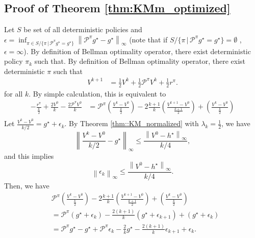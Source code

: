 \documentclass{article} %
\newcommand{\cP}{\mathcal{P}}
\newcommand*{\para}[1]{\left({#1}\right)}
\newcommand*{\infn}[1]{\left\|{#1}\right\|_{\infty}}
\begin{document}
\subsection{Proof of Theorem \ref{thm:KMm_optimized} }

 Let $S$ be set of all deterministic policies and $\epsilon=\inf_{\pi \in S/\{\pi \,|\, \cP^{\pi}g^{\star} =  g^{\star}\}} \infn{\cP^{\pi}g^{\star}-g^{\star}}$ (note that if $S/\{\pi \,|\, \cP^{\pi}g^{\star} =  g^{\star}\} = \emptyset $ , $\epsilon =\infty$). By definition of Bellman optimality operator, there exist deterministic policy $\pi_k$ such that. 
 By definition of Bellman optimality operator, there exist deterministic $\pi$ such that 
  \begin{align*}
        V^{k+1} &= \frac{1}{2}V^{k}+\frac{1}{2}\cP^{\pi}V^{k} + \frac{1}{2}r^{\pi}.
    \end{align*}
    for all $k$. By simple calculation, this is equivalent to
           \begin{align*}
        -\frac{r^{\pi}}{{\frac{k}{2}}}+\frac{2V^0}{k}-\frac{2\cP^{\pi}V^0}{k} &= \cP^{\pi}\para{\frac{V^{k}-V^0}{\frac{k}{2}} }-2\frac{k+1}{k}\para{\frac{V^{k+1}-V^0}{\frac{k+1}{2}}}+\para{\frac{V^{k}-V^0}{\frac{k}{2}}}\\
        \end{align*}
        Let $\frac{V^k-V^0}{k/2} = g^{\star}+ \epsilon_k$. By Theorem \ref{thm::KM_normalized} with $\lambda_k =\frac{1}{2}$, we have
    \[\infn{\frac{V^k-V^0}{k/2}-g^{\star}} \le \frac{\infn{V^0-h^{\star}}}{k/4},\]
    and this implies 
        \[\infn{\epsilon_k} \le \frac{\infn{V^0-h^{\star}}}{k/4}.\]
        Then, we have
        \begin{align*}
        &\cP^{\pi}\para{\frac{V^{k}-V^0}{\frac{k}{2}} }-2\frac{k+1}{k}\para{\frac{V^{k+1}-V^0}{\frac{k+1}{2}}}+\para{\frac{V^{k}-V^0}{\frac{k}{2}}} 
        \\&= \cP^{\pi}\para{g^{\star}+\epsilon_k }-\frac{2(k+1)}{k}\para{g^{\star}+\epsilon_{k+1} }+\para{g^{\star}+\epsilon_k }\\
             &= \cP^{\pi}g^{\star}-g^{\star}+\cP^{\pi}\epsilon_k -\frac{2}{k}g^{\star}-\frac{2(k+1)}{k}\epsilon_{k+1} +\epsilon_k.
    \end{align*}
\end{document}
